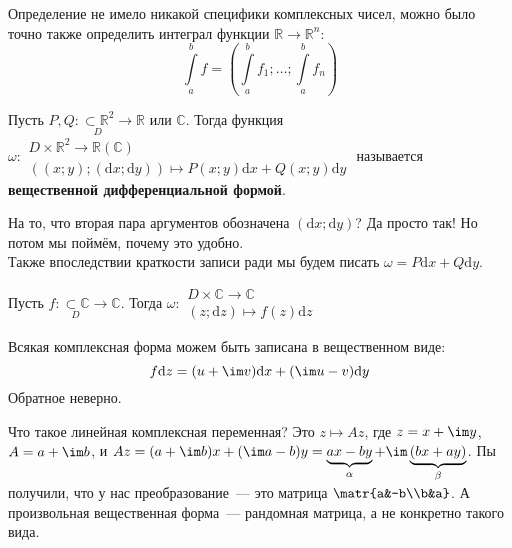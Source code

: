 \documentclass{article}
\begin{document}
    \begin{remark}
        Определение не имело никакой специфики комплексных чисел, можно было точно также определить интеграл функции $\mathbb R\to\mathbb R^n$:
        $$
        \int\limits_a^bf=\left(\int\limits_a^bf_1;\ldots;\int\limits_a^bf_n\right)
        $$
    \end{remark}
    \begin{definition}
        Пусть $P,Q\colon\underset{D}{\subset\mathbb R^2}\to\mathbb R$ или $\mathbb C$. Тогда функция $\omega\colon\substack{D\times\mathbb R^2\to\mathbb R(\mathbb C)\\((x;y);(\mathrm dx;\mathrm dy))\mapsto P(x;y)\mathrm dx+Q(x;y)\mathrm dy}$ называется \textbf{вещественной дифференциальной формой}.
    \end{definition}
    \begin{remark}
        На то, что вторая пара аргументов обозначена $(\mathrm dx;\mathrm dy)$? Да просто так! Но потом мы поймём, почему это удобно.\\
        Также впоследствии краткости записи ради мы будем писать $\omega=P\mathrm dx+Q\mathrm dy$.
    \end{remark}
    \begin{definition}
        Пусть $f\colon\underset{D}{\subset\mathbb C}\to\mathbb C$. Тогда $\omega\colon\substack{D\times\mathbb C\to\mathbb C\\(z;\mathrm dz)\mapsto f(z)\mathrm dz}$
    \end{definition}
    \begin{claim}
        Всякая комплексная форма можем быть записана в вещественном виде:
        $$
        f\mathrm dz=(u+\im v)\mathrm dx+(\im u-v)\mathrm dy
        $$
        Обратное неверно.
    \end{claim}
    \begin{remark}
        Что такое линейная комплексная переменная? Это $z\mapsto Az$, где $z=x+\im y$, $A=a+\im b$, и $Az=(a+\im b)x+(\im a-b)y=\underbrace{ax-by}_\alpha+\im\underbrace{(bx+ay)}_\beta$. Пы получили, что у нас преобразование~--- это матрица $\matr{a&-b\\b&a}$. А произвольная вещественная форма~--- рандомная матрица, а не конкретно такого вида.
    \end{remark}
\end{document}
